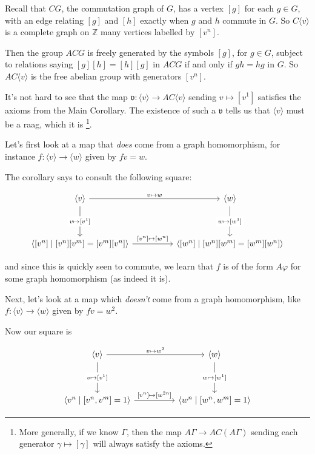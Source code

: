 \documentclass[12pt]{article}
\theoremstyle{definition}
\theoremstyle{theorem}
\begin{document}
Recall that $CG$, the commutation graph of $G$, has a vertex $[g]$ for 
each $g \in G$, with an edge relating $[g]$ and $[h]$ exactly when 
$g$ and $h$ commute in $G$. So $C \langle v \rangle$ is a complete 
graph on $\mathbb{Z}$ many vertices labelled by $[v^n]$.

Then the group $ACG$ is freely generated by the symbols $[g]$, for $g \in G$,
subject to relations saying $[g][h] = [h][g]$ in $ACG$ if and only if 
$gh = hg$ in $G$. So $AC \langle v \rangle$ is the free abelian group with 
generators $[v^n]$.

It's not hard to see that the map 
$\mathfrak{v} : \langle v \rangle \to AC \langle v \rangle$
sending $v \mapsto [v^1]$ satisfies the axioms from the Main Corollary. 
The existence of such a $\mathfrak{v}$ tells us that 
$\langle v \rangle$ must be a raag, which it is%
\footnote{More generally, if we know $\Gamma$, then the map 
$A\Gamma \to AC(A\Gamma)$ sending each generator $\gamma \mapsto [\gamma]$ 
will always satisfy the axioms.}.

\bigskip

Let's first look at a map that \emph{does} come from a graph homomorphism,
for instance $f : \langle v \rangle \to \langle w \rangle$ given by $fv = w$.

The corollary says to consult the following square:

\[
  \begin{tikzcd}
    {\langle v \rangle} && {\langle w \rangle} \\
    \\
    {\left \langle [v^n] \mid [v^n][v^m] = [v^m][v^n] \right \rangle} 
    && 
    {\left \langle [w^n] \mid [w^n][w^m] = [w^m][w^n] \right \rangle}
    \arrow["{v \mapsto w}", from=1-1, to=1-3]
    \arrow["{[v^n] \mapsto [w^n]}", from=3-1, to=3-3]
    \arrow["{v \mapsto [v^1]}"{description}, from=1-1, to=3-1]
    \arrow["{w \mapsto [w^1]}"{description}, from=1-3, to=3-3]
  \end{tikzcd}
\]

and since this is quickly seen to commute, we learn that $f$ is of the form 
$A \varphi$ for some graph homomorphism (as indeed it is).

\bigskip

Next, let's look at a map which \emph{doesn't} come from a graph homomorphism,
like $f : \langle v \rangle \to \langle w \rangle$ given by $fv = w^2$.

Now our square is

\[\begin{tikzcd}
	{\langle v \rangle} && {\langle w \rangle} \\
	\\
	{\langle v^n \mid [v^n,v^m] = 1 \rangle} && {\langle w^n \mid [w^n, w^m] = 1 \rangle}
	\arrow["{v \mapsto w^2}", from=1-1, to=1-3]
  \arrow["{[v^n] \mapsto [w^{2n}]}", from=3-1, to=3-3]
	\arrow["{v \mapsto [v^1]}"{description}, from=1-1, to=3-1]
	\arrow["{w \mapsto [w^1]}"{description}, from=1-3, to=3-3]
\end{tikzcd}\]
\end{document}
